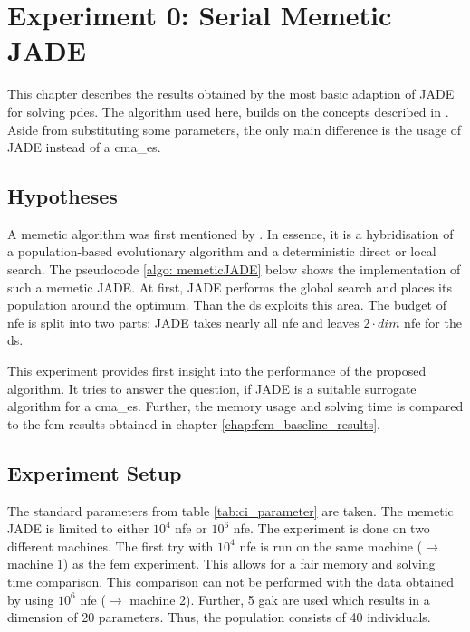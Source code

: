 \documentclass[./\jobname.tex]{subfiles}
\begin{document}
\chapter {Experiment 0: Serial Memetic JADE}
\label{chap:experimet_0}

This chapter describes the results obtained by the most basic adaption of JADE for solving \gls{pde}s. The algorithm used here, builds on the concepts described in \cite{chaquet_using_2019}. Aside from substituting some parameters, the only main difference is the usage of JADE instead of a \gls{cma_es}. 

\section{Hypotheses}
A memetic algorithm was first mentioned by \cite{moscato_evolution_2000}. In essence, it is a hybridisation of a population-based evolutionary algorithm and a deterministic direct or local search. The pseudocode \ref{algo: memeticJADE} below shows the implementation of such a memetic JADE. At first, JADE performs the global search and places its population around the optimum. Than the \gls{ds} exploits this area. The budget of \gls{nfe} is split into two parts: JADE takes nearly all \gls{nfe} and leaves $2\cdot dim$ \gls{nfe} for the \gls{ds}. 

\begin{algorithm}[h]
	\SetAlgoNoLine
	\DontPrintSemicolon
	\label{algo: memeticJADE}
\end{algorithm}

This experiment provides first insight into the performance of the proposed algorithm. It tries to answer the question, if JADE is a suitable surrogate algorithm for a \gls{cma_es}. Further, the memory usage and solving time is compared to the \gls{fem} results obtained in chapter \ref{chap:fem_baseline_results}. 

\section{Experiment Setup}
The standard parameters from table \ref{tab:ci_parameter} are taken. The memetic JADE is limited to either $10^4$ \gls{nfe} or $10^6$ \gls{nfe}. The experiment is done on two different machines. The first try with $10^4$ \gls{nfe} is run on the same machine ($\rightarrow$ machine 1) as the \gls{fem} experiment. This allows for a fair memory and solving time comparison. This comparison can not be performed with the data obtained by using $10^6$ \gls{nfe} ($\rightarrow$ machine 2). Further, 5 \gls{gak} are used which results in a dimension of 20 parameters. Thus, the population consists of 40 individuals. 
\end{document}
